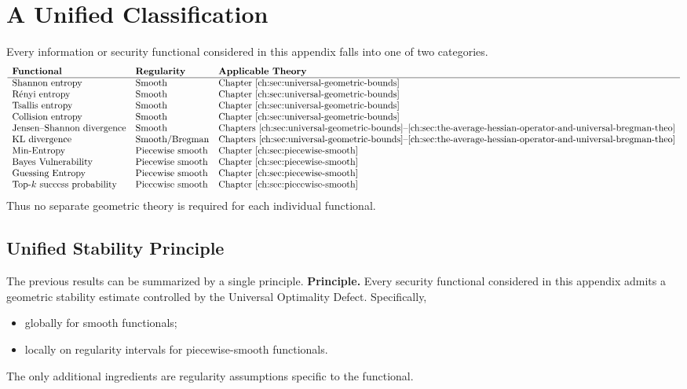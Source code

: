 \section{A Unified Classification}
Every information or security functional considered in this appendix
falls into one of two categories.
\[
\begin{array}{lll}
\textbf{Functional} & \textbf{Regularity} & \textbf{Applicable Theory} \\ \hline
\text{Shannon entropy} & \text{Smooth} & \text{Chapter~\ref{ch:sec:universal-geometric-bounds}} \\
\text{R\'enyi entropy} & \text{Smooth} & \text{Chapter~\ref{ch:sec:universal-geometric-bounds}} \\
\text{Tsallis entropy} & \text{Smooth} & \text{Chapter~\ref{ch:sec:universal-geometric-bounds}} \\
\text{Collision entropy} & \text{Smooth} & \text{Chapter~\ref{ch:sec:universal-geometric-bounds}} \\
\text{Jensen--Shannon divergence} & \text{Smooth} & \text{Chapters~\ref{ch:sec:universal-geometric-bounds}--\ref{ch:sec:the-average-hessian-operator-and-universal-bregman-theo}} \\
\text{KL divergence} & \text{Smooth/Bregman} & \text{Chapters~\ref{ch:sec:universal-geometric-bounds}--\ref{ch:sec:the-average-hessian-operator-and-universal-bregman-theo}} \\
\text{Min-Entropy} & \text{Piecewise smooth} & \text{Chapter~\ref{ch:sec:piecewise-smooth}} \\
\text{Bayes Vulnerability} & \text{Piecewise smooth} & \text{Chapter~\ref{ch:sec:piecewise-smooth}} \\
\text{Guessing Entropy} & \text{Piecewise smooth} & \text{Chapter~\ref{ch:sec:piecewise-smooth}} \\
\text{Top-\(k\) success probability} & \text{Piecewise smooth} & \text{Chapter~\ref{ch:sec:piecewise-smooth}}
\end{array}
\]
Thus no separate geometric theory is required for each individual
functional.
\subsection{Unified Stability Principle}\label{ch:sec:unified-stability-principle}
The previous results can be summarized by a single principle.
\textbf{Principle.}
Every security functional considered in this appendix admits a geometric
stability estimate controlled by the Universal Optimality Defect.
Specifically,
\begin{itemize}
\item globally for smooth functionals;
\item locally on regularity intervals for piecewise-smooth functionals.
\end{itemize}
The only additional ingredients are regularity assumptions specific to
the functional.
